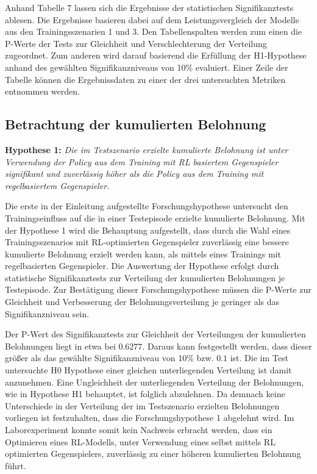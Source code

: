 Anhand Tabelle 7 lassen sich die Ergebnisse der statistischen Signifikanztests ablesen.
Die Ergebnisse basieren dabei auf dem Leistungsvergleich der Modelle aus den Trainingsszenarien 1 und 3.
Den Tabellenspalten werden zum einen die P-Werte der Tests zur Gleichheit und Verschlechterung der Verteilung zugeordnet.
Zum anderen wird darauf basierend die Erfüllung der H1-Hypothese anhand des gewählten Signifikanzniveaus von 10\% evaluiert.
Einer Zeile der Tabelle können die Ergebnissdaten zu einer der drei untersuchten Metriken entnommen werden.

\subsection{Betrachtung der kumulierten Belohnung}

\textbf{Hypothese 1:}
\textit{Die im Testszenario erzielte kumulierte Belohnung ist unter Verwendung der Policy aus dem Training mit RL basiertem Gegenspieler signifikant und zuverlässig höher als die Policy aus dem Training mit regelbasiertem Gegenspieler.}

Die erste in der Einleitung aufgestellte Forschungshypothese untersucht den Trainingseinfluss auf die in einer Testepisode erzielte kumulierte Belohnung.
Mit der Hypothese 1 wird die Behauptung aufgestellt, dass durch die Wahl eines Trainingsszenarios mit RL-optimierten Gegenspieler zuverlässig eine bessere kumulierte Belohnung erzielt werden kann, als mittels eines Trainings mit regelbasierten Gegenspieler.
Die Auswertung der Hypothese erfolgt durch statistische Signifikanztests zur Verteilung der kumulierten Belohnungen je Testepisode.
Zur Bestätigung dieser Forschungshypothese müssen die P-Werte zur Gleichheit und Verbesserung der Belohnungsverteilung je geringer als das Signifikanzniveau sein. 

Der P-Wert des Signifikanztests zur Gleichheit der Verteilungen der kumulierten Belohnungen liegt in etwa bei $0.6277$.
Daraus kann festgestellt werden, dass dieser größer als das gewählte Signifikanzniveau von 10\% bzw. $0.1$ ist.
Die im Test untersuchte H0 Hypothese einer gleichen unterliegenden Verteilung ist damit anzunehmen.
Eine Ungleichheit der unterliegenden Verteilung der Belohnungen, wie in Hypothese H1 behauptet, ist folglich abzulehnen.
Da demnach keine Unterschiede in der Verteilung der im Testszenario erzielten Belohnungen vorliegen ist festzuhalten, dass die Forschungshypothese 1 abgelehnt wird.
Im Laborexperiment konnte somit kein Nachweis erbracht werden, dass ein Optimieren eines RL-Modells, unter Verwendung eines selbst mittels RL optimierten Gegenspielers, zuverlässig zu einer höheren kumulierten Belohnung führt.

